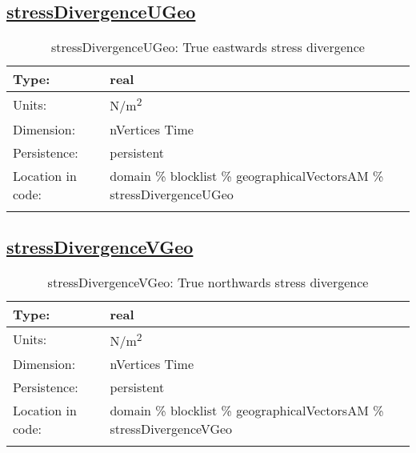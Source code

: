 \subsection[stressDivergenceUGeo]{\hyperref[sec:var_tab_geographicalVectorsAM]{stressDivergenceUGeo}}
\label{subsec:var_sec_geographicalVectorsAM_stressDivergenceUGeo}
\begin{center}
\begin{longtable}{| p{2.0in} | p{4.0in} |}
        \hline 
        Type: & real \\
        \hline 
        Units: & \si{N/m^2} \\
        \hline 
        Dimension: & nVertices Time \\
        \hline 
        Persistence: & persistent \\
        \hline 
         Location in code: & domain \% blocklist \% geographicalVectorsAM \% stressDivergenceUGeo \\
         \hline 
    \caption{stressDivergenceUGeo: True eastwards stress divergence}
\end{longtable}
\end{center}
\subsection[stressDivergenceVGeo]{\hyperref[sec:var_tab_geographicalVectorsAM]{stressDivergenceVGeo}}
\label{subsec:var_sec_geographicalVectorsAM_stressDivergenceVGeo}
\begin{center}
\begin{longtable}{| p{2.0in} | p{4.0in} |}
        \hline 
        Type: & real \\
        \hline 
        Units: & \si{N/m^2} \\
        \hline 
        Dimension: & nVertices Time \\
        \hline 
        Persistence: & persistent \\
        \hline 
         Location in code: & domain \% blocklist \% geographicalVectorsAM \% stressDivergenceVGeo \\
         \hline 
    \caption{stressDivergenceVGeo: True northwards stress divergence}
\end{longtable}
\end{center}
